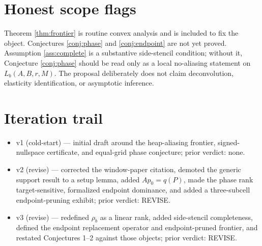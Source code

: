 \documentclass[11pt]{article}
\theoremstyle{definition}
\theoremstyle{plain}
\theoremstyle{remark}
\begin{document}
\section{Honest scope flags}
Theorem \ref{thm:frontier} is routine convex analysis and is included to fix the object. Conjectures \ref{conj:phase} and \ref{conj:endpoint} are not yet proved. Assumption \ref{ass:complete} is a substantive side-stencil condition; without it, Conjecture \ref{conj:phase} should be read only as a local no-aliasing statement on $L_b(A,B,r,M)$. The proposal deliberately does not claim deconvolution, elasticity identification, or asymptotic inference.

\section{Iteration trail}
\begin{itemize}[leftmargin=*]
\item v1 (cold-start) — initial draft around the heap-aliasing frontier, signed-nullspace certificate, and equal-grid phase conjecture; prior verdict: none.
\item v2 (revise) — corrected the window-paper citation, demoted the generic support result to a setup lemma, added $Ap_0=q(P)$, made the phase rank target-sensitive, formalized endpoint dominance, and added a three-subcell endpoint-pruning exhibit; prior verdict: REVISE.
\item v3 (revise) — redefined $\rho_b$ as a linear rank, added side-stencil completeness, defined the endpoint replacement operator and endpoint-pruned frontier, and restated Conjectures 1--2 against those objects; prior verdict: REVISE.
\end{itemize}
\end{document}
